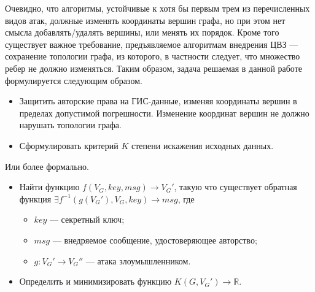 Очевидно, что алгоритмы, устойчивые к хотя бы первым трем из перечисленных видов атак, должные изменять координаты вершин графа, 
но при этом нет смысла добавлять/удалять вершины, или менять их порядок. 
Кроме того существует важное требование, предъявляемое алгоритмам внедрения ЦВЗ --- сохранение топологии графа, из которого, в частности следует,
что множество ребер не должно изменяться.
Таким образом, задача решаемая в данной работе формулируется следующим образом. 
\begin{itemize}
    \item Защитить авторские права на ГИС-данные, изменяя координаты вершин в пределах допустимой погрешности. 
    Изменение координат вершин не должно нарушать топологии графа.
    \item Сформулировать критерий $K$ степени искажения исходных данных.
\end{itemize}
Или более формально.
\begin{itemize}
    \item Найти функцию $f(V_G, key, msg) \to V_G'$, такую что существует обратная функция $\exists f^{-1}(g(V_G'), V_G, key) \to msg$, где
    \begin{itemize}
        \item $key$ --- секретный ключ;
        \item $msg$ --- внедряемое сообщение, удостоверяющее авторство;
        \item $g: V_G' \to V_G''$ --- атака злоумышленником.
    \end{itemize}
    \item Определить и минимизировать функцию $K(G, V_G') \to \mathbb{R}$.
\end{itemize}
